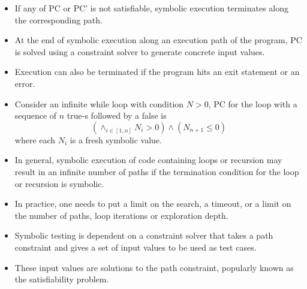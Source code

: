 \documentclass[a4paper]{article}
\begin{document}
\begin{itemize}
    \item If any of PC or PC' is not satisfiable, symbolic execution terminates along the corresponding path.
    \item At the end of symbolic execution along an execution path of the program, PC is solved using a constraint solver to generate concrete input values.
    \item Execution can also be terminated if the program hits an exit statement or an error.
    \item Consider an infinite while loop with condition $N>0$, PC for the loop with a sequence of $n$ true-s followed by a false is
    \begin{equation*}
        (\land_{i\in [1,n]}N_i>0)\land (N_{n+1}\leq 0)
    \end{equation*}
    where each $N_i$ is a fresh symbolic value.
    \item In general, symbolic execution of code containing loops or recursion may result in an infinite number of paths if the termination condition for the loop or recursion is symbolic.
    \item In practice, one needs to put a limit on the search, a timeout, or a limit on the number of paths, loop iterations or exploration depth.
    \item Symbolic testing is dependent on a constraint solver that takes a path constraint and gives a set of input values to be used as test cases.
    \item These input values are solutions to the path constraint, popularly known as the satisfiability problem.
\end{itemize}
\end{document}
